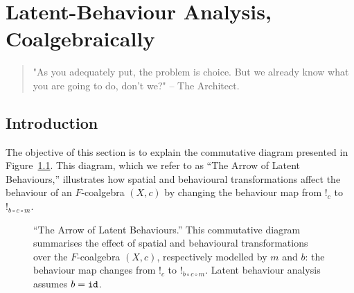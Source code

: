 

\chapter{Latent-Behaviour Analysis, Coalgebraically} %
\label{ch:LatentBehaviours} %
\begin{quote} 
"As you adequately put, the problem is choice. But we already know what you are going to do, don't we?" -- The Architect.
\end{quote} 

\section{Introduction}
The objective of this section is to explain the commutative diagram presented in Figure~\ref{fig:TheArrow}. This diagram, which we refer to as ``The Arrow of Latent Behaviours,'' illustrates how spatial and behavioural transformations affect the behaviour of an $F$-coalgebra $(X,c)$ by changing the behaviour map from $!_c$ to $!_{b\circ c\circ m}$. 

\begin{figure}[h]
        \centering
        \caption{``The Arrow of Latent Behaviours.'' This commutative diagram summarises the effect of spatial and behavioural transformations over the $F$-coalgebra $(X,c)$, respectively modelled by $m$ and $b$: the behaviour map changes from $!_c$ to $!_{b\circ c\circ m}$. Latent behaviour analysis assumes $b={\texttt{id}}$.}
        \label{fig:TheArrow} 
    \end{figure}

